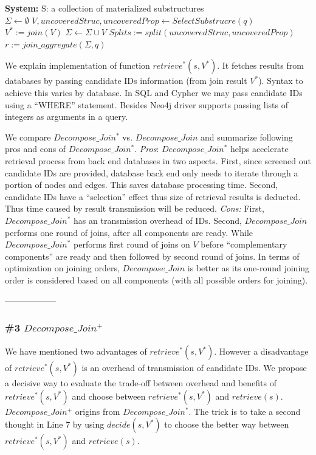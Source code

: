 \begin{algorithm}[H]
\caption{$Decompose\_Join^{*}$}
\LinesNumbered
\textbf{System:} S: a collection of materialized substructures\\
$\Sigma \gets \emptyset $\;
$V, uncoveredStruc, uncoveredProp \gets SelectSubstrucre(q) $\;
$V^{*}:=join(V)$\;
$\Sigma \gets \Sigma \cup V $\;
$Splits:=split(uncoveredStruc, uncoveredProp)$\;
$r := join\_aggregate(\Sigma, q)$\;
\end{algorithm}


We explain implementation of function $retrieve^{*}(s, V^{*})$. It fetches results from databases by passing candidate IDs information (from join result $V^{*}$). Syntax to achieve this varies by database. In SQL and Cypher we may pass candidate IDs using a ``WHERE'' statement. Besides Neo4j driver supports passing lists of integers as arguments in a query.


We compare $Decompose\_Join^{*}$ vs.  $Decompose\_Join$ and summarize following pros and cons of $Decompose\_Join^{*}$. \textit{Pros}: $Decompose\_Join^{*}$ helps accelerate retrieval process from back end databases in two aspects. First, since screened out candidate IDs are provided, database back end only needs to iterate through a portion of nodes and edges. This saves database processing time. Second, candidate IDs have a ``selection'' effect thus size of retrieval results is deducted. Thus time caused by result transmission will be reduced. \textit{Cons:} First, $Decompose\_Join^{*}$ has an transmission overhead of IDs. Second, $Decompose\_Join$ performs one round of joins, after all components are ready. While $Decompose\_Join^{*}$ performs first round of joins on $V$ before ``complementary components'' are ready and then followed by second round of joins. In terms of optimization on joining orders, $Decompose\_Join$ is better as its one-round joining order is considered based on all components (with all possible orders for joining).

------------------
\subsubsection{\#3 $Decompose\_Join^{+}$}
We have mentioned two advantages of $retrieve^{*}(s, V^{*})$. However a disadvantage of $retrieve^{*}(s, V^{*})$ is an overhead of transmission of candidate IDs. We propose a decisive way to evaluate the trade-off between overhead and benefits of $retrieve^{*}(s, V^{*})$ and choose between $retrieve^{*}(s, V^{*})$ and $retrieve(s)$. $Decompose\_Join^{+}$ origins from $Decompose\_Join^{*}$. The trick is to take a second thought in Line 7 by using $decide(s,V^{*})$ to choose the better way between $retrieve^{*}(s, V^{*})$ and $retrieve(s)$.

